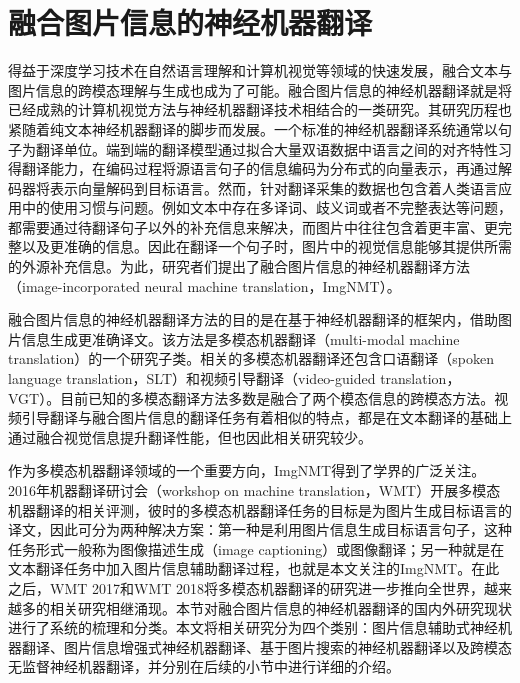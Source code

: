\section{融合图片信息的神经机器翻译}
\label{sec:2_imgnmt}

得益于深度学习技术在自然语言理解和计算机视觉等领域的快速发展，融合文本与图片信息的跨模态理解与生成也成为了可能。融合图片信息的神经机器翻译就是将已经成熟的计算机视觉方法与神经机器翻译技术相结合的一类研究。其研究历程也紧随着纯文本神经机器翻译的脚步而发展。一个标准的神经机器翻译系统通常以句子为翻译单位。端到端的翻译模型通过拟合大量双语数据中语言之间的对齐特性习得翻译能力，在编码过程将源语言句子的信息编码为分布式的向量表示，再通过解码器将表示向量解码到目标语言。然而，针对翻译采集的数据也包含着人类语言应用中的使用习惯与问题。例如文本中存在多译词、歧义词或者不完整表达等问题，都需要通过待翻译句子以外的补充信息来解决，而图片中往往包含着更丰富、更完整以及更准确的信息。因此在翻译一个句子时，图片中的视觉信息能够其提供所需的外源补充信息。为此，研究者们提出了融合图片信息的神经机器翻译方法（image-incorporated neural machine translation，ImgNMT）。

融合图片信息的神经机器翻译方法的目的是在基于神经机器翻译的框架内，借助图片信息生成更准确译文。该方法是多模态机器翻译（multi-modal machine translation）的一个研究子类。相关的多模态机器翻译还包含口语翻译（spoken language translation，SLT）和视频引导翻译（video-guided translation，VGT）。目前已知的多模态翻译方法多数是融合了两个模态信息的跨模态方法。视频引导翻译与融合图片信息的翻译任务有着相似的特点，都是在文本翻译的基础上通过融合视觉信息提升翻译性能，但也因此相关研究较少。

作为多模态机器翻译领域的一个重要方向，ImgNMT得到了学界的广泛关注。2016年机器翻译研讨会（workshop on machine translation，WMT）开展多模态机器翻译的相关评测，彼时的多模态机器翻译任务的目标是为图片生成目标语言的译文，因此可分为两种解决方案：第一种是利用图片信息生成目标语言句子，这种任务形式一般称为图像描述生成（image captioning）或图像翻译；另一种就是在文本翻译任务中加入图片信息辅助翻译过程，也就是本文关注的ImgNMT。在此之后，WMT 2017和WMT 2018将多模态机器翻译的研究进一步推向全世界，越来越多的相关研究相继涌现。本节对融合图片信息的神经机器翻译的国内外研究现状进行了系统的梳理和分类。本文将相关研究分为四个类别：图片信息辅助式神经机器翻译、图片信息增强式神经机器翻译、基于图片搜索的神经机器翻译以及跨模态无监督神经机器翻译，并分别在后续的小节中进行详细的介绍。


